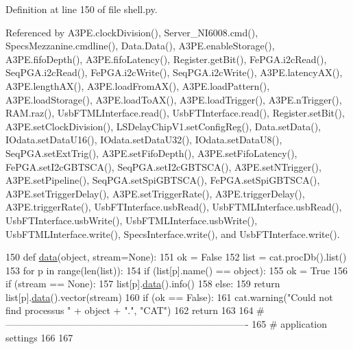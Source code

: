 Definition at line 150 of file shell.\+py.



Referenced by A3\+P\+E.\+clock\+Division(), Server\+\_\+\+N\+I6008.\+cmd(), Specs\+Mezzanine.\+cmdline(), Data.\+Data(), A3\+P\+E.\+enable\+Storage(), A3\+P\+E.\+fifo\+Depth(), A3\+P\+E.\+fifo\+Latency(), Register.\+get\+Bit(), Fe\+P\+G\+A.\+i2c\+Read(), Seq\+P\+G\+A.\+i2c\+Read(), Fe\+P\+G\+A.\+i2c\+Write(), Seq\+P\+G\+A.\+i2c\+Write(), A3\+P\+E.\+latency\+A\+X(), A3\+P\+E.\+length\+A\+X(), A3\+P\+E.\+load\+From\+A\+X(), A3\+P\+E.\+load\+Pattern(), A3\+P\+E.\+load\+Storage(), A3\+P\+E.\+load\+To\+A\+X(), A3\+P\+E.\+load\+Trigger(), A3\+P\+E.\+n\+Trigger(), R\+A\+M.\+raz(), Usb\+F\+T\+M\+L\+Interface.\+read(), Usb\+F\+T\+Interface.\+read(), Register.\+set\+Bit(), A3\+P\+E.\+set\+Clock\+Division(), L\+S\+Delay\+Chip\+V1.\+set\+Config\+Reg(), Data.\+set\+Data(), I\+Odata.\+set\+Data\+U16(), I\+Odata.\+set\+Data\+U32(), I\+Odata.\+set\+Data\+U8(), Seq\+P\+G\+A.\+set\+Ext\+Trig(), A3\+P\+E.\+set\+Fifo\+Depth(), A3\+P\+E.\+set\+Fifo\+Latency(), Fe\+P\+G\+A.\+set\+I2c\+G\+B\+T\+S\+C\+A(), Seq\+P\+G\+A.\+set\+I2c\+G\+B\+T\+S\+C\+A(), A3\+P\+E.\+set\+N\+Trigger(), A3\+P\+E.\+set\+Pipeline(), Seq\+P\+G\+A.\+set\+Spi\+G\+B\+T\+S\+C\+A(), Fe\+P\+G\+A.\+set\+Spi\+G\+B\+T\+S\+C\+A(), A3\+P\+E.\+set\+Trigger\+Delay(), A3\+P\+E.\+set\+Trigger\+Rate(), A3\+P\+E.\+trigger\+Delay(), A3\+P\+E.\+trigger\+Rate(), Usb\+F\+T\+Interface.\+usb\+Read(), Usb\+F\+T\+M\+L\+Interface.\+usb\+Read(), Usb\+F\+T\+Interface.\+usb\+Write(), Usb\+F\+T\+M\+L\+Interface.\+usb\+Write(), Usb\+F\+T\+M\+L\+Interface.\+write(), Specs\+Interface.\+write(), and Usb\+F\+T\+Interface.\+write().


\begin{DoxyCode}
150 \textcolor{keyword}{def }\hyperlink{namespaceshell_a5ea2525995cedc3efd69ea8a7f034d1e}{data}(object, stream=None):
151   ok = \textcolor{keyword}{False}
152   list = cat.procDb().list()
153   \textcolor{keywordflow}{for} p \textcolor{keywordflow}{in} range(len(list)):
154     \textcolor{keywordflow}{if} (list[p].name() == object):
155       ok = \textcolor{keyword}{True}
156       \textcolor{keywordflow}{if} (stream == \textcolor{keywordtype}{None}):
157         list[p].\hyperlink{namespaceshell_a5ea2525995cedc3efd69ea8a7f034d1e}{data}().info()
158       \textcolor{keywordflow}{else}:
159         \textcolor{keywordflow}{return} list[p].\hyperlink{namespaceshell_a5ea2525995cedc3efd69ea8a7f034d1e}{data}().vector(stream)
160   \textcolor{keywordflow}{if} (ok == \textcolor{keyword}{False}):
161     cat.warning(\textcolor{stringliteral}{"Could not find processus "} + object + \textcolor{stringliteral}{"."}, \textcolor{stringliteral}{"CAT"})
162     \textcolor{keywordflow}{return}
163 
164 \textcolor{comment}{#----------------------------------------------------------------------------}
165 \textcolor{comment}{# application settings}
166 
167 
\end{DoxyCode}
\mbox{\label{namespaceshell_a324876531afa651f59288dbab3f5603a}} 
